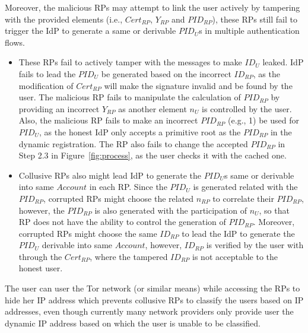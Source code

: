 Moreover, the malicious RPs may attempt to link the user actively by tampering with the provided elements (i.e., $Cert_{RP}$, $Y_{RP}$ and $PID_{RP}$), these RPs still fail to trigger the IdP to generate a same or derivable $PID_U$s in multiple authentication flows. 
\begin{itemize}
\item These RPs fail to actively tamper with the messages to make $ID_U$ leaked. IdP fails to lead the $PID_U$ be generated based on the incorrect $ID_{RP}$, as the modification of  $Cert_{RP}$ will make the signature invalid and be found by the user. The malicious RP fails to manipulate  the calculation of $PID_{RP}$ by providing an incorrect $Y_{RP}$ as another element $n_U$ is  controlled by the user. Also, the malicious RP fails to make an incorrect $PID_{RP}$ (e.g., 1)  be used for $PID_U$, as the honest IdP only accepts a primitive root as the $PID_{RP}$ in the dynamic registration. The RP also fails to change the accepted $PID_{RP}$ in Step 2.3 in Figure~\ref{fig:process}, as the user checks it with the cached one.
\item Collusive RPs also might lead IdP to generate the $PID_U$s same or  derivable into same $Account$ in each RP. Since the $PID_U$ is generated related with the $PID_{RP}$, corrupted RPs might choose the related $n_{RP}$ to correlate their $PID_{RP}$, however, the $PID_{RP}$ is also generated with the participation of $n_{U}$, so that RP does not have the ability to control the generation of $PID_{RP}$. Moreover, corrupted RPs might choose the same $ID_{RP}$ to lead the IdP to generate the $PID_U$ derivable into same $Account$, however, $ID_{RP}$ is verified by the user with through the $Cert_{RP}$, where the tampered $ID_{RP}$ is not acceptable to the honest user.
\end{itemize}

The user can user the Tor network (or similar means) while accessing the RPs to hide her IP address
which prevents collusive RPs to classify the users based on IP addresses, even though currently many network providers only provide user the dynamic IP address based on which the user is unable to be classified.


